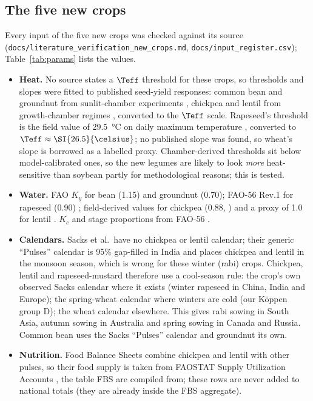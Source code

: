 \subsection{The five new crops}
Every input of the five new crops was checked against its source (\texttt{docs/\allowbreak literature\_\allowbreak verification\_\allowbreak new\_\allowbreak crops.md},
\texttt{docs/\allowbreak input\_\allowbreak register.csv}); Table~\ref{tab:params} lists the values.
\begin{itemize}
\item \textbf{Heat.} No source states a $\Teff$ threshold for these crops, so thresholds and slopes were
fitted to published seed-yield responses: common bean and groundnut from sunlit-chamber experiments
\citep{prasad2002bean,prasad2003peanut}, chickpea and lentil from growth-chamber regimes \citep{bhandari2020},
converted to the $\Teff$ scale. Rapeseed's threshold is the field value of \SI{29.5}{\celsius} on daily
maximum temperature \citep{morrison2002}, converted to $\Teff \approx \SI{26.5}{\celsius}$; no published
slope was found, so wheat's slope is borrowed as a labelled proxy. Chamber-derived thresholds sit below
model-calibrated ones, so the new legumes are likely to look \emph{more} heat-sensitive than soybean
partly for methodological reasons; this is tested.
\item \textbf{Water.} FAO $K_y$ for bean (1.15) and groundnut (0.70); FAO-56 Rev.1 for rapeseed (0.90)
\citep{fao56rev1}; field-derived values for chickpea (0.88, \citealp{tari2022}) and a proxy of 1.0 for
lentil \citep{nandi2021}. $K_c$ and stage proportions from FAO-56 \citep{fao56}.
\item \textbf{Calendars.} Sacks et al.\ have no chickpea or lentil calendar; their generic ``Pulses''
calendar is 95\% gap-filled in India and places chickpea and lentil in the monsoon season, which is wrong
for these winter (rabi) crops. Chickpea, lentil and rapeseed-mustard therefore use a cool-season rule:
the crop's own observed Sacks calendar where it exists (winter rapeseed in China, India and Europe); the
spring-wheat calendar where winters are cold (our K\"oppen group D); the wheat calendar elsewhere. This
gives rabi sowing in South Asia, autumn sowing in Australia and spring sowing in Canada and Russia.
Common bean uses the Sacks ``Pulses'' calendar and groundnut its own.
\item \textbf{Nutrition.} Food Balance Sheets combine chickpea and lentil with other pulses, so their food
supply is taken from FAOSTAT Supply Utilization Accounts \citep{faosua}, the table FBS are compiled from;
these rows are never added to national totals (they are already inside the FBS aggregate).
\end{itemize}

